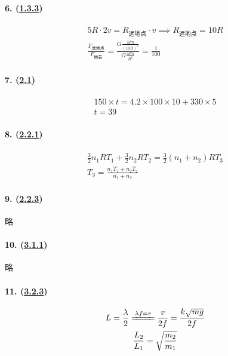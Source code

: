\paragraph{6. (\hyperref[subsec:1.3.3]{1.3.3})}

\begin{gather*}
    5R\cdot2v=R_\textrm{远地点}\cdot v\implies R_\textrm{远地点}=10R\\
    \frac{F_\textrm{远地点}}{F_\textrm{地表}}=
    \frac{G\frac{Mm}{(10R)^2}}{G\frac{Mm}{R^2}}=\frac{1}{100}
\end{gather*}

\paragraph{7. (\hyperref[sec:2.1]{2.1})}

\begin{gather*}
    150\times t=4.2\times100\times10+330\times5\\
    t=39
\end{gather*}

\paragraph{8. (\hyperref[subsec:2.2.1]{2.2.1})}

\begin{gather*}
    \frac32n_1RT_1+\frac32n_2RT_2=\frac32(n_1+n_2)RT_3\\
    T_3=\frac{n_1T_1+n_2T_2}{n_1+n_2}
\end{gather*}

\paragraph{9. (\hyperref[subsec:2.2.3]{2.2.3})} 略
\paragraph{10. (\hyperref[subsec:3.1.1]{3.1.1})} 略
\paragraph{11. (\hyperref[subsec:3.2.3]{3.2.3})}

\begin{gather*}
    L=\frac{\lambda}{2}\xlongequal{\lambda f=v}\frac{v}{2f}=\frac{k\sqrt{mg}}{2f}\\
    \frac{L_2}{L_1}=\sqrt{\frac{m_2}{m_1}}
\end{gather*}

